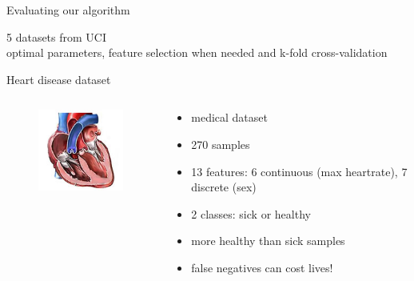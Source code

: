 \documentclass[english]{beamer}
\begin{document}
\begin{frame}{Evaluating our algorithm}
	\begin{block}{}
		5 datasets from UCI \\
		optimal parameters, feature selection when needed and k-fold cross-validation
	\end{block}
\end{frame}

\begin{frame}{Heart disease dataset}
	\begin{columns}
		\begin{column}{0.35\textwidth}
			\begin{figure}
				\centering
				\includegraphics[scale=0.75]{figures/heart.jpg}
			\end{figure}
		\end{column}
		
		\begin{column}{0.65\textwidth}
			\begin{itemize}
				\item medical dataset
				\item 270 samples
				\item 13 features: 6 continuous (max heartrate), 7 discrete (sex)
				\item 2 classes: sick or healthy
				\item more healthy than sick samples
				\item false negatives can cost lives!
			\end{itemize}
		\end{column}
	\end{columns}
\end{frame}
\end{document}
